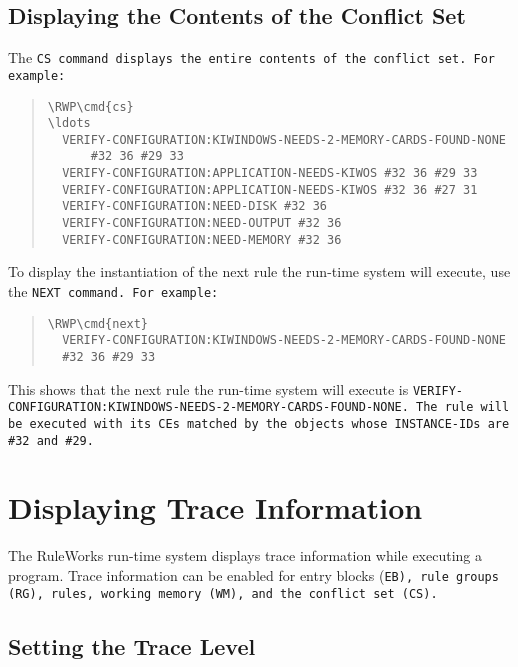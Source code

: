 \subsection{Displaying the Contents of the Conflict Set}

The \tt{CS} command displays the entire contents of the conflict set.
For example:

\begin{quote}
\begin{Verbatim}[commandchars=\\\{\}]
\RWP\cmd{cs}
\ldots
  VERIFY-CONFIGURATION:KIWINDOWS-NEEDS-2-MEMORY-CARDS-FOUND-NONE
      #32 36 #29 33
  VERIFY-CONFIGURATION:APPLICATION-NEEDS-KIWOS #32 36 #29 33
  VERIFY-CONFIGURATION:APPLICATION-NEEDS-KIWOS #32 36 #27 31
  VERIFY-CONFIGURATION:NEED-DISK #32 36
  VERIFY-CONFIGURATION:NEED-OUTPUT #32 36
  VERIFY-CONFIGURATION:NEED-MEMORY #32 36
\end{Verbatim}
\end{quote}

To display the instantiation of the next rule the run-time
system will execute, use the \tt{NEXT} command. For example:

\begin{quote}
\begin{Verbatim}[commandchars=\\\{\}]
\RWP\cmd{next}
  VERIFY-CONFIGURATION:KIWINDOWS-NEEDS-2-MEMORY-CARDS-FOUND-NONE
  #32 36 #29 33
\end{Verbatim}
\end{quote}

This shows that the next rule the run-time system will execute is
\tt{VERIFY-CONFIGURATION:KIWINDOWS-NEEDS-2-MEMORY-CARDS-FOUND-NONE}.
The rule will be executed with its CEs matched by the objects whose
\tt{INSTANCE-ID}s are \verb|#32| and \verb|#29|.

\section{Displaying Trace Information}

The RuleWorks run-time system displays trace information while
executing a program. Trace information can be enabled for entry blocks
(\tt{EB}), rule groups (\tt{RG}), rules, working memory (\tt{WM}), and
the conflict set (\tt{CS}).

\subsection{Setting the Trace Level}

